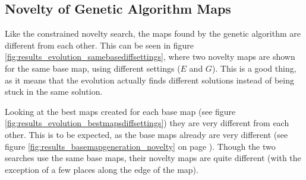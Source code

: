 \subsection*{Novelty of Genetic Algorithm Maps}

Like the constrained novelty search, the maps found by the genetic algorithm are different from each other. This can be seen in figure \ref{fig:results_evolution_samebasediffsettings}, where two novelty maps are shown for the same base map, using different settings ($E$ and $G$). This is a good thing, as it means that the evolution actually finds different solutions instead of being stuck in the same solution.


Looking at the best maps created for each base map (see figure \ref{fig:results_evolution_bestmapsdiffsettings}) they are very different from each other. This is to be expected, as the base maps already are very different (see figure \ref{fig:results_basemapgeneration_novelty} on page \pageref{fig:results_basemapgeneration_novelty}). Though the two searches use  the same base maps, their novelty maps are quite different (with the exception of a few places along the edge of the map).

